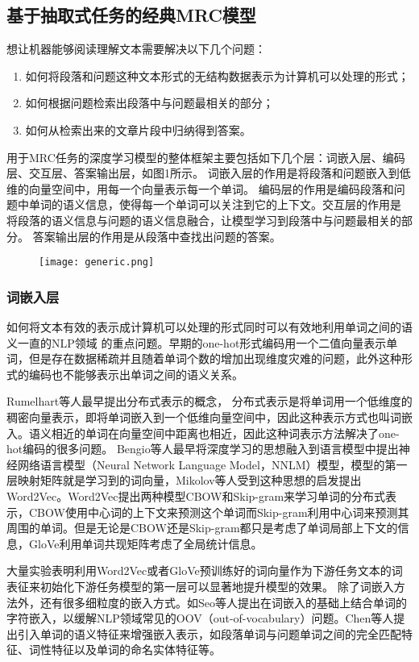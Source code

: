 \subsection{基于抽取式任务的经典MRC模型}
想让机器能够阅读理解文本需要解决以下几个问题：
\begin{enumerate}
	\item 如何将段落和问题这种文本形式的无结构数据表示为计算机可以处理的形式；
	\item 如何根据问题检索出段落中与问题最相关的部分；
	\item 如何从检索出来的文章片段中归纳得到答案。
\end{enumerate}
用于MRC任务的深度学习模型的整体框架主要包括如下几个层：词嵌入层、编码层、交互层、答案输出层，如图1所示。
词嵌入层的作用是将段落和问题嵌入到低维的向量空间中，用每一个向量表示每一个单词。
编码层的作用是编码段落和问题中单词的语义信息，使得每一个单词可以关注到它的上下文。交互层的作用是
将段落的语义信息与问题的语义信息融合，让模型学习到段落中与问题最相关的部分。
答案输出层的作用是从段落中查找出问题的答案。
\begin{figure}
	\centering
	\texttt{[image: generic.png]}
\end{figure}

\subsubsection{词嵌入层}
如何将文本有效的表示成计算机可以处理的形式同时可以有效地利用单词之间的语义一直的NLP领域
的重点问题。早期的one-hot形式编码用一个二值向量表示单词，但是存在数据稀疏并且随着单词个数的增加出现维度灾难的问题，此外这种形式的编码也不能够表示出单词之间的语义关系。

Rumelhart等人最早提出分布式表示的概念，
分布式表示是将单词用一个低维度的稠密向量表示，即将单词嵌入到一个低维向量空间中，因此这种表示方式也叫词嵌入。语义相近的单词在向量空间中距离也相近，因此这种词表示方法解决了one-hot编码的很多问题。
Bengio等人\cite{NNLM}最早将深度学习的思想融入到语言模型中提出神经网络语言模型（Neural Network Language Model，NNLM）模型，模型的第一层映射矩阵就是学习到的词向量，Mikolov等人受到这种思想的启发提出Word2Vec。Word2Vec提出两种模型CBOW和Skip-gram来学习单词的分布式表示，CBOW使用中心词的上下文来预测这个单词而Skip-gram利用中心词来预测其周围的单词。但是无论是CBOW还是Skip-gram都只是考虑了单词局部上下文的信息，GloVe利用单词共现矩阵考虑了全局统计信息。


大量实验表明利用Word2Vec或者GloVe预训练好的词向量作为下游任务文本的词表征来初始化下游任务模型的第一层可以显著地提升模型的效果。
除了词嵌入方法外，还有很多细粒度的嵌入方式。如Seo等人提出在词嵌入的基础上结合单词的字符嵌入，以缓解NLP领域常见的OOV（out-of-vocabulary）问题。Chen等人提出引入单词的语义特征来增强嵌入表示，如段落单词与问题单词之间的完全匹配特征、词性特征以及单词的命名实体特征等。

